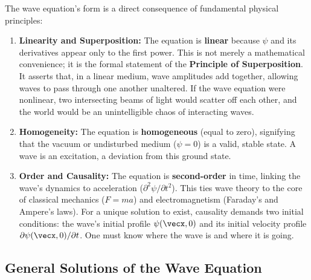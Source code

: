 \begin{proposition}
The wave equation's form is a direct consequence of fundamental physical principles:
\begin{enumerate}
    \item \textbf{Linearity and Superposition:} The equation is \textbf{linear} because $\psi$ and its derivatives appear only to the first power. This is not merely a mathematical convenience; it is the formal statement of the \textbf{Principle of Superposition}. It asserts that, in a linear medium, wave amplitudes add together, allowing waves to pass through one another unaltered. If the wave equation were nonlinear, two intersecting beams of light would scatter off each other, and the world would be an unintelligible chaos of interacting waves.
    
    \item \textbf{Homogeneity:} The equation is \textbf{homogeneous} (equal to zero), signifying that the vacuum or undisturbed medium ($\psi=0$) is a valid, stable state. A wave is an excitation, a deviation from this ground state.
    
    \item \textbf{Order and Causality:} The equation is \textbf{second-order} in time, linking the wave's dynamics to acceleration ($\partial^2 \psi / \partial t^2$). This ties wave theory to the core of classical mechanics ($F=ma$) and electromagnetism (Faraday's and Ampere's laws). For a unique solution to exist, causality demands two initial conditions: the wave's initial profile $\psi(\vecx, 0)$ and its initial velocity profile $\partial\psi(\vecx, 0)/\partial t$. One must know where the wave is and where it is going.
\end{enumerate}
\end{proposition}

\subsection{General Solutions of the Wave Equation}

